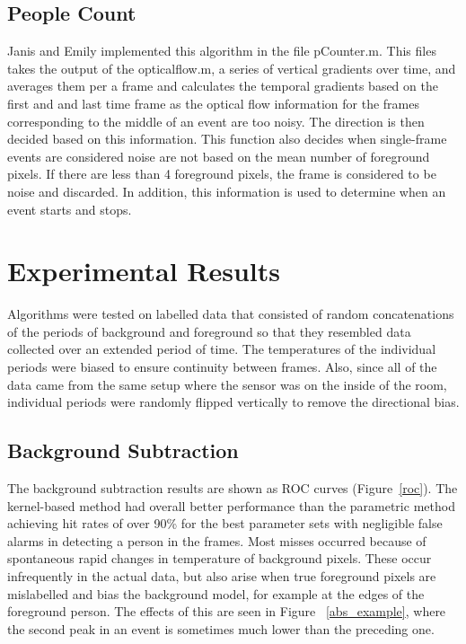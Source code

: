 \documentclass[12pt,oneside]{article} %
\begin{document}
\subsection{People Count}
Janis and Emily implemented this algorithm in the file pCounter.m. This files takes the output of the opticalflow.m, a series of vertical gradients over time, and averages them per a frame and calculates the temporal gradients based on the first and and last time frame as the optical flow information for the frames corresponding to the middle of an event are too noisy. The direction is then decided based on this information. This function also decides when single-frame events are considered noise are not based on the mean number of foreground pixels. If there are less than 4 foreground pixels, the frame is considered to be noise and discarded. In addition, this information is used to determine when an event starts and stops.

\section{Experimental Results}  %
Algorithms were tested on labelled data that consisted of random concatenations of the 
periods of background and foreground so that they resembled data collected
over an extended period of time. The temperatures of the individual periods were biased
to ensure continuity between frames. Also, since all of the data came from the same
setup where the sensor was on the inside of the room, individual periods were randomly flipped
vertically to remove the directional bias.

\subsection{Background Subtraction}  %
The background subtraction results are shown as ROC curves (Figure~\ref{roc}).
The kernel-based method
had overall better performance than the parametric method achieving hit rates of over 90\% for the best
parameter sets with negligible false alarms in detecting a person in the frames. Most misses occurred
because of spontaneous rapid changes in temperature of background pixels. These occur infrequently
in the actual data, but also arise when true foreground pixels are mislabelled and bias the background model, for 
example at the edges of the foreground person. The effects of this are seen in Figure~ \ref{abs_example}, where
the second peak in an event is sometimes much lower than the preceding one.
\end{document}
